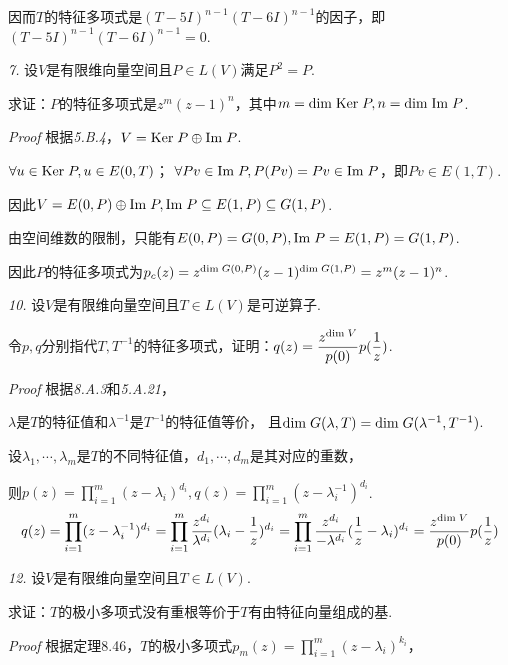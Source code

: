 因而\(T\)的特征多项式是\((T-5I)^{n-1}(T-6I)^{n-1}\)的因子，即\((T-5I)^{n-1}(T-6I)^{n-1}=0\).

\hspace*{\fill}

\textit{7.}
设\(V\)是有限维向量空间且\(P \in L(V)\)满足\(P^2=P\).

求证：\(P\)的特征多项式是\(z^m(z-1)^n\)，其中\(m=\mathrm{dim \;} \mathrm{Ker \;} P,n=\mathrm{dim \;} \mathrm{Im \;} P\).

\textit{Proof}
根据\textit{5.B.4}，\(V=\mathrm{Ker \;} P \oplus \mathrm{Im \;} P\).

\(\forall u \in \mathrm{Ker \;} P,u \in E(0,T)\)；
\(\forall Pv \in \mathrm{Im \;} P,P(Pv)=Pv \in \mathrm{Im \;} P\)，即\(Pv \in E(1,T)\).

因此\(V=E(0,P) \oplus \mathrm{Im \;} P,\mathrm{Im \;} P \subseteq E(1,P) \subseteq G(1,P)\).

由空间维数的限制，只能有\(E(0,P)=G(0,P),\mathrm{Im \;} P=E(1,P)=G(1,P)\).

因此\(P\)的特征多项式为\(p_c(z)=z^{\mathrm{dim \;} G(0,P)}(z-1)^{\mathrm{dim \;} G(1,P)}=z^m(z-1)^n\).

\newpage

\textit{10.}
设\(V\)是有限维向量空间且\(T \in L(V)\)是可逆算子.

令\(p,q\)分别指代\(T,T^{-1}\)的特征多项式，证明：\(q(z)=\dfrac{z^{\mathrm{dim \;} V}}{p(0)}p(\dfrac{1}{z})\).

\textit{Proof}
根据\textit{8.A.3}和\textit{5.A.21}，

\(\lambda\)是\(T\)的特征值和\(\lambda^{-1}\)是\(T^{-1}\)的特征值等价，
且\(\mathrm{dim \;} G(\lambda,T)=\mathrm{dim \;} G(\lambda^{-1},T^{-1})\).

设\(\lambda_1,\cdots,\lambda_m\)是\(T\)的不同特征值，\(d_1,\cdots,d_m\)是其对应的重数，

则\(p(z)=\prod_{i=1}^m (z-\lambda_i)^{d_i},q(z)=\prod_{i=1}^m (z-\lambda_i^{-1})^{d_i}\).
    \begin{align*}
        q(z)=\prod_{i=1}^m (z-\lambda_i^{-1})^{d_i}
            =\prod_{i=1}^m \dfrac{z^{d_i}}{\lambda^{d_i}}(\lambda_i-\dfrac{1}{z})^{d_i}
            =\prod_{i=1}^m \dfrac{z^{d_i}}{-\lambda^{d_i}}(\dfrac{1}{z}-\lambda_i)^{d_i}
            =\dfrac{z^{\mathrm{dim \;} V}}{p(0)}p(\dfrac{1}{z})
    \end{align*}

\hspace*{\fill}

\textit{12.}
设\(V\)是有限维向量空间且\(T \in L(V)\).

求证：\(T\)的极小多项式没有重根等价于\(T\)有由特征向量组成的基.

\textit{Proof}
根据定理8.46，\(T\)的极小多项式\(p_m(z)=\prod_{i=1}^m (z-\lambda_i)^{k_i}\)，

